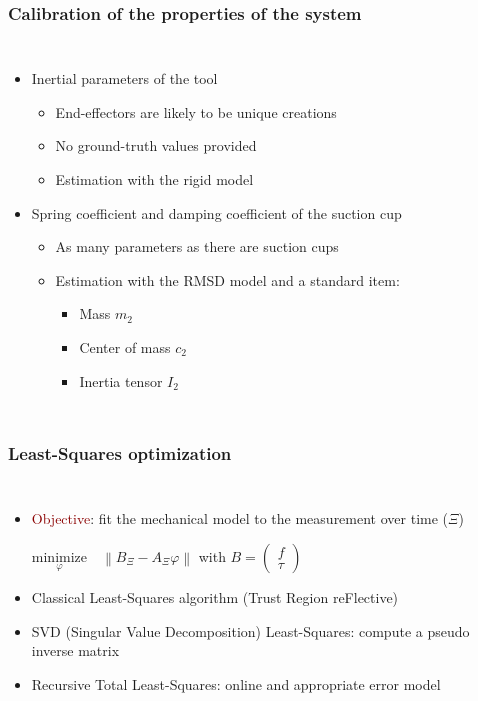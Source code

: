 \documentclass[aspectratio=1610]{beamer}
\newcommand{\norm}[1]{\left\lVert#1\right\rVert}
\begin{document}
\begin{frame}
\frametitle{Calibration of the properties of the system}
\begin{columns}
\column{37em}
\begin{itemize}\itemsep1em
  \justifying
  \item Inertial parameters of the tool
  \begin{itemize}
    \item End-effectors are likely to be unique creations
    \item No ground-truth values provided
    \item Estimation with the rigid model
  \end{itemize}
  \item Spring coefficient and damping coefficient of the suction cup
  \begin{itemize}
    \item As many parameters as there are suction cups
    \item Estimation with the RMSD model and a standard item:
    \begin{itemize}
      \item Mass $m_2$
      \item Center of mass $c_2$
      \item Inertia tensor $I_2$
    \end{itemize}
  \end{itemize}
\end{itemize}
\end{columns}
\end{frame}

\begin{frame}
\frametitle{Least-Squares optimization}
\begin{columns}
\column{37em}
\begin{itemize}\itemsep1em
  \justifying
  \item \textcolor{darkred}{Objective}: fit the mechanical model to the measurement over time ($\Xi$) \\

  \begin{center}
   $\underset{\varphi}{\textrm{minimize}} \quad
   \norm{
   B_{\Xi}
   - A_{\Xi} \varphi}$ \qquad
   with
   $B = \begin{pmatrix}
   f    \\
   \tau
   \end{pmatrix}$
 \end{center}


\item \textcolor{Ocean}{Classical Least-Squares} algorithm (Trust Region reFlective)
\item \textcolor{Ocean}{SVD (Singular Value Decomposition) Least-Squares}: compute a pseudo inverse matrix
\item \textcolor{Ocean}{Recursive Total Least-Squares}: online and appropriate error model
\end{itemize}
\end{columns}
\end{frame}
\end{document}
